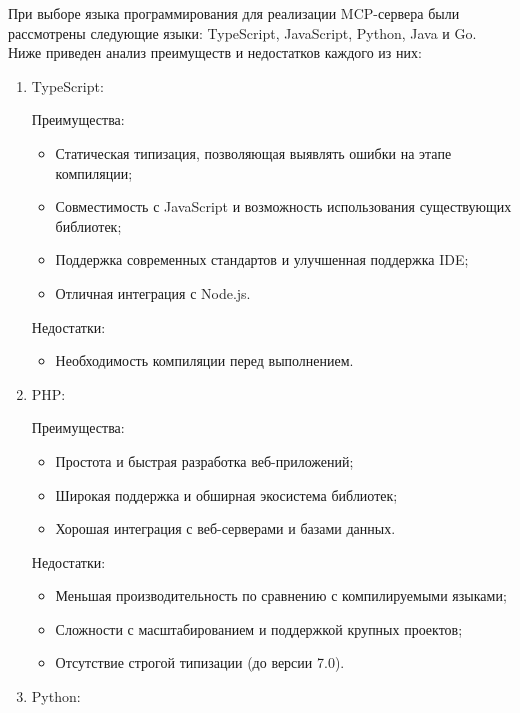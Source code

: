 \documentclass[utf8, russian]{eskdtext}
\begin{document}
При выборе языка программирования для реализации MCP-сервера были рассмотрены следующие языки: TypeScript, JavaScript, Python, Java и Go. Ниже приведен анализ преимуществ и недостатков каждого из них:

\begin{enumerate}
    \item {TypeScript:}

        Преимущества:
        \begin{itemize}
            \item Статическая типизация, позволяющая выявлять ошибки на этапе компиляции;
            \item Совместимость с JavaScript и возможность использования существующих библиотек;
            \item Поддержка современных стандартов и улучшенная поддержка IDE;
            \item Отличная интеграция с Node.js.
        \end{itemize}

        Недостатки:
        \begin{itemize}
            \item Необходимость компиляции перед выполнением.
        \end{itemize}
    
    \item {PHP:}

     Преимущества:
        \begin{itemize}
            \item Простота и быстрая разработка веб-приложений;
            \item Широкая поддержка и обширная экосистема библиотек;
            \item Хорошая интеграция с веб-серверами и базами данных.
        \end{itemize}

    Недостатки:
        \begin{itemize}
            \item Меньшая производительность по сравнению с компилируемыми языками;
            \item Сложности с масштабированием и поддержкой крупных проектов;
            \item Отсутствие строгой типизации (до версии 7.0).
        \end{itemize}
    
    \item {Python:}


\end{enumerate}
\end{document}

